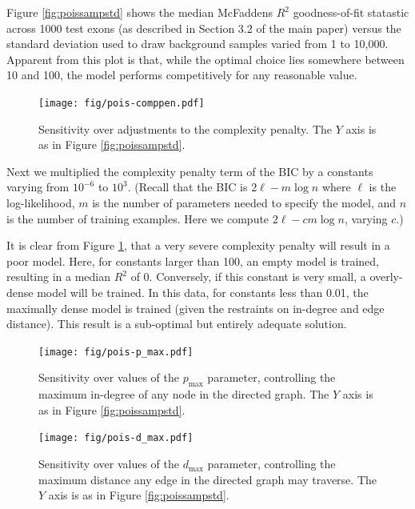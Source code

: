 \documentclass[letterpaper]{article}
\begin{document}
Figure \ref{fig:poissampstd} shows the median McFaddens $R^2$ goodness-of-fit
statastic across 1000 test exons (as described in Section 3.2 of the main paper)
versus the standard deviation used to draw background samples varied from 1 to
10,000. Apparent from this plot is that, while the optimal choice lies somewhere
between 10 and 100, the model performs competitively for any reasonable value.


\begin{figure}[H]
\begin{center}
\texttt{[image: fig/pois-comppen.pdf]}
\end{center}
\caption{Sensitivity over adjustments to the complexity penalty. The $Y$ axis is
as in Figure \ref{fig:poissampstd}.}
\label{fig:poiscomppen}
\end{figure}

Next we multiplied the complexity penalty term of the BIC by a constants varying
from $10^{-6}$ to $10^{3}$. (Recall that the BIC is $2\ell - m \log n$ where
$\ell$ is the log-likelihood, $m$ is the number of parameters needed to specify
the model, and $n$ is the number of training examples. Here we compute $2 \ell -
c m \log n$, varying $c$.)

It is clear from Figure \ref{fig:poiscomppen}, that a very severe complexity
penalty will result in a poor model. Here, for constants larger than 100, an
empty model is trained, resulting in a median $R^2$ of 0. Conversely, if
this constant is very small, a overly-dense model will be trained.  In this
data, for constants less than 0.01, the maximally dense model is trained (given
the restraints on in-degree and edge distance). This result is a sub-optimal but
entirely adequate solution.


\begin{figure}[H]
\begin{center}
\texttt{[image: fig/pois-p\_max.pdf]}
\end{center}
\caption{Sensitivity over values of the $p_{\text{max}}$ parameter,
controlling the maximum in-degree of any node in the directed graph. The $Y$ axis is
as in Figure \ref{fig:poissampstd}.}
\label{fig:pois_p_max}
\end{figure}

\begin{figure}[H]
\begin{center}
\texttt{[image: fig/pois-d\_max.pdf]}
\end{center}
\caption{Sensitivity over values of the $d_{\text{max}}$ parameter, controlling
the maximum distance any edge in the directed graph may traverse.  The $Y$ axis
is as in Figure \ref{fig:poissampstd}.}
\label{fig:pois_d_max}
\end{figure}
\end{document}
